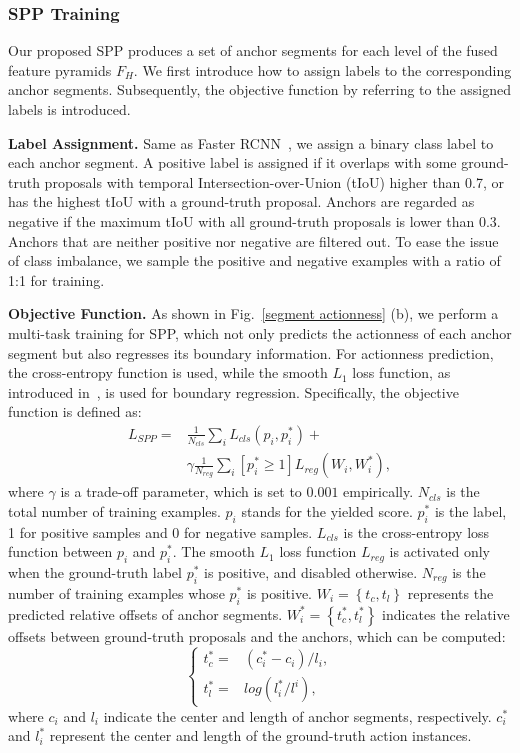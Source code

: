 \documentclass[10pt,twocolumn,letterpaper]{article}
\begin{document}
\subsubsection{SPP Training}
 Our proposed SPP produces a set of anchor segments  for each level  of the fused feature pyramids $F_H$. We  first introduce how to assign labels to the corresponding anchor segments. Subsequently, the objective function by referring to the assigned labels is introduced.

\textbf{Label Assignment.} 
{Same as Faster RCNN~\cite{faster_rcnn}, we assign a binary class label to each anchor segment. A positive label is assigned if it overlaps with some ground-truth proposals with temporal Intersection-over-Union (tIoU) higher than 0.7, or has the highest tIoU with a ground-truth proposal. Anchors are regarded as negative if the maximum tIoU with all ground-truth proposals is lower than 0.3. Anchors that are neither positive nor negative are filtered out. To ease the issue of class imbalance, we sample the positive and negative examples with a ratio of 1:1 for training.}


\textbf{Objective Function.} As shown in  Fig.~\ref{segment actionness} (b), we perform a multi-task training for SPP, which not only predicts the actionness of each anchor segment but also regresses its boundary information. For actionness prediction, the cross-entropy function is used, while the smooth $L_1$ loss function, as introduced in~\cite{fast_rcnn}, is used for boundary regression. Specifically, the objective function is defined as:
\begin{equation}
\begin{split}
L_{SPP} = & \frac{1}{N_{cls}}\sum_{i}L_{cls}(p_{i},p_{i}^{*})+\\
&\gamma \frac{1}{N_{reg}}\sum
_{i}[p_{i}^{*}\geqslant 1]L_{reg}(W_{i},W_{i}^{*}),
\end{split}
\end{equation}
where $\gamma$ is a trade-off parameter, which is set to $0.001$ empirically. $N_{cls}$ is the total number of training examples. $p_{i}$ stands for the yielded score. $p_i^*$ is the label, 1 for positive samples and 0 for negative samples. $L_{cls}$ is the cross-entropy loss function between $p_{i}$ and $p_{i}^{*}$. The smooth $L_1$ loss function $L_{reg}$ is activated only when the ground-truth label $p_{i}^{*}$ is positive, and disabled otherwise. $N_{reg}$ is the number of training examples whose $p_{i}^{*}$ is positive. $W_{i}=\left \{t_{c},t_{l}\right\}$ represents the predicted relative offsets of anchor segments. $W_{i}^{*}=\left\{t_{c}^{*},t_{l}^{*}\right\}$ indicates the relative offsets between ground-truth proposals and the anchors, which can be computed: 
\begin{equation}
\left\{\begin{matrix} t_{c}^{*}=&(c_{i}^{*}-c_{i})/ l_{i},  \\
t_{l}^{*}=&log(l_{i}^{*}/l^{i}), \end{matrix}\right.
\end{equation}
where $c_{i}$ and $l_{i}$ indicate the center and  length of anchor segments, respectively. $c_{i}^{*}$ and $l_{i}^{*}$ represent the center and length  of the ground-truth action instances.
\end{document}
